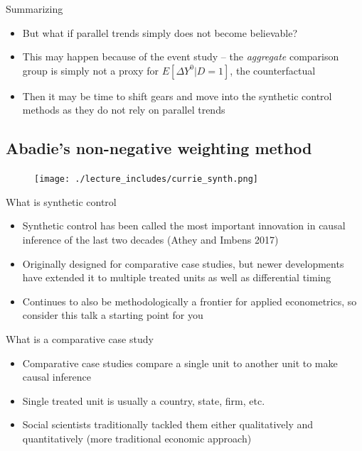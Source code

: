 \documentclass{beamer}
\begin{document}
\begin{frame}{Summarizing}

\begin{itemize}

\item But what if parallel trends simply does not become believable?
\item This may happen because of the event study -- the \emph{aggregate} comparison group is simply not a proxy for $E[\Delta Y^0|D=1]$, the counterfactual
\item Then it may be time to shift gears and move into the synthetic control methods as they do not rely on parallel trends

\end{itemize}

\end{frame}






   

\subsection{Abadie's non-negative weighting method}


\begin{frame}[plain]
	\begin{figure}
	\texttt{[image: ./lecture\_includes/currie\_synth.png]}
	\end{figure}
\end{frame}

\begin{frame}{What is synthetic control}
	
	\begin{itemize}
	\item Synthetic control has been called the most important innovation in causal inference of the last two decades (Athey and Imbens 2017)
	\item Originally designed for comparative case studies, but newer developments have extended it to multiple treated units as well as differential timing
	\item Continues to also be methodologically a frontier for applied econometrics, so consider this talk a starting point for you
	\end{itemize}
\end{frame}
	
\begin{frame}{What is a comparative case study}

\begin{itemize}
\item Comparative case studies compare a single unit to another unit to make causal inference
\item Single treated unit is usually a country, state, firm, etc.
\item Social scientists traditionally tackled them either qualitatively and quantitatively (more traditional economic approach)
\end{itemize}

\end{frame}
\end{document}
